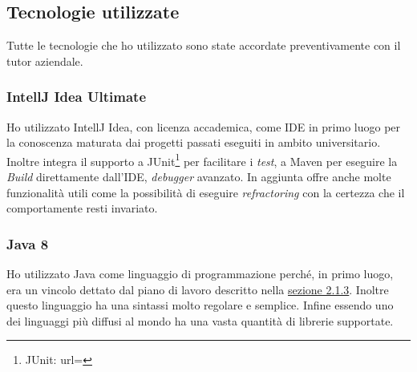 \subsection{Tecnologie utilizzate}
Tutte le tecnologie che ho utilizzato sono state accordate preventivamente con il tutor aziendale.
\subsubsection{IntellJ Idea Ultimate}
Ho utilizzato IntellJ Idea, con licenza accademica, come \gls{IDE} in primo luogo per la conoscenza maturata dai progetti passati eseguiti in ambito universitario. Inoltre integra il supporto a JUnit\footnote{JUnit: url= } per facilitare i \textit{test}, a Maven per eseguire la \textit{Build} direttamente dall'\gls{IDE}, \textit{debugger} avanzato. In aggiunta offre anche molte funzionalità utili come la possibilità di eseguire \textit{\gls{refractoring}} con la certezza che il comportamente resti invariato.

\subsubsection{Java 8}
Ho utilizzato Java come linguaggio di programmazione perché, in primo luogo, era un vincolo dettato dal piano di lavoro descritto nella \hyperlink{sec:pianodl}{sezione 2.1.3}. Inoltre questo linguaggio ha una sintassi molto regolare e semplice. Infine essendo uno dei linguaggi più diffusi al mondo ha una vasta quantità di librerie supportate.
